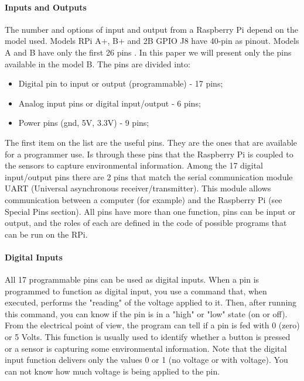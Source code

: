 \documentclass{acm_proc_article-sp}
\begin{document}
\paragraph{Inputs and Outputs}
The number and options of input and output from a Raspberry Pi depend on the model used. Models RPi A+, B+ and 2B GPIO J8 have 40-pin as pinout. Models A and B have only the first 26 pins \cite{raspUsage}. In this paper we will present only the pins available in the model B. The pins are divided into:

\begin{itemize}
\item Digital pin to input or output (programmable) - 17 pins;	
\item Analog input pins or digital input/output - 6 pins;
\item Power pins (gnd, 5V, 3.3V) - 9 pins;
\end{itemize}

The first item on the list are the useful pins. They are the ones that are available for a programmer use. Is through these pins that the Raspberry Pi is coupled to the sensors to capture environmental information. Among the 17 digital input/output pins there are 2 pins that match the serial communication module UART (Universal asynchronous receiver/transmitter). This module allows communication between a computer (for example) and the Raspberry Pi (see Special Pins section). All pins have more than one function, pins can be input or output, and the roles of each are defined in the code of possible programs that can be run on the RPi.

\paragraph{Digital Inputs}
All 17 programmable pins can be used as digital inputs. When a pin is programmed to function as digital input, you use a command that, when executed, performs the "reading" of the voltage applied to it. Then, after running this command, you can know if the pin is in a "high" or "low" state (on or off).
\newline
\newline
From the electrical point of view, the program can tell if a pin is fed with 0 (zero) or 5 Volts. This function is usually used to identify whether a button is pressed or a sensor is capturing some environmental information. Note that the digital input function delivers only the values 0 or 1 (no voltage or with voltage). You can not know how much voltage is being applied to the pin.
\end{document}
